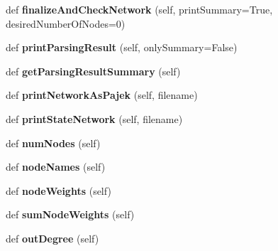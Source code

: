 \begin{DoxyCompactItemize}
def {\bfseries finalize\+And\+Check\+Network} (self, print\+Summary=True, desired\+Number\+Of\+Nodes=0)
\item 
\mbox{\label{classinfomapfolder_1_1infomap_1_1Network_a23614f81f427757094d20d0dc9154c0c}} 
def {\bfseries print\+Parsing\+Result} (self, only\+Summary=False)
\item 
\mbox{\label{classinfomapfolder_1_1infomap_1_1Network_a6b7f977fdaa3272a4c28712154307d83}} 
def {\bfseries get\+Parsing\+Result\+Summary} (self)
\item 
\mbox{\label{classinfomapfolder_1_1infomap_1_1Network_a34f48b9415937254c035c0bc3e0d0b90}} 
def {\bfseries print\+Network\+As\+Pajek} (self, filename)
\item 
\mbox{\label{classinfomapfolder_1_1infomap_1_1Network_abd12e93643efa93f3d6229b7629a2843}} 
def {\bfseries print\+State\+Network} (self, filename)
\item 
\mbox{\label{classinfomapfolder_1_1infomap_1_1Network_a62faa9476da8f9b24c622d7a7b8839b3}} 
def {\bfseries num\+Nodes} (self)
\item 
\mbox{\label{classinfomapfolder_1_1infomap_1_1Network_a72f77ef3647e99421125a1148c7c6423}} 
def {\bfseries node\+Names} (self)
\item 
\mbox{\label{classinfomapfolder_1_1infomap_1_1Network_ad0a830f1ab6a8ab1dcbc0280ab41a31b}} 
def {\bfseries node\+Weights} (self)
\item 
\mbox{\label{classinfomapfolder_1_1infomap_1_1Network_afc533361f8e896371a4dc4ee7794560e}} 
def {\bfseries sum\+Node\+Weights} (self)
\item 
\mbox{\label{classinfomapfolder_1_1infomap_1_1Network_ab8172a144368a1b246b86465317b92f0}} 
def {\bfseries out\+Degree} (self)
\item 

\end{DoxyCompactItemize}
